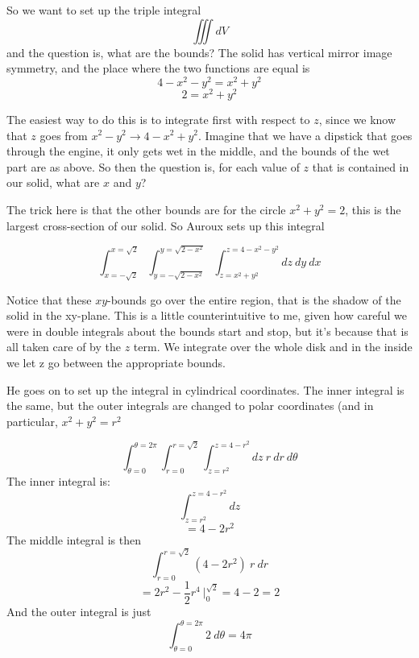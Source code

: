 \documentclass[11pt, oneside]{article}   	%
\begin{document}
So we want to set up the triple integral
\[ \iiint dV \]
and the question is, what are the bounds?  The solid has vertical mirror image symmetry, and the place where the two functions are equal is
\[  4 - x^2 - y^2 = x^2 + y^2 \]
\[  2 = x^2 + y^2 \]

The easiest way to do this is to integrate first with respect to $z$, since we know that $z$ goes from $x^2 - y^2 \to 4 - x^2 + y^2$.  Imagine that we have a dipstick that goes through the engine, it only gets wet in the middle, and the bounds of the wet part are as above.  So then the question is, for each value of $z$ that is contained in our solid, what are $x$ and $y$?

The trick here is that the other bounds are for the circle $x^2 + y^2 = 2$, this is the largest cross-section of our solid.  So Auroux sets up this integral

\[ \int_{x=-\sqrt{2}}^{x=\sqrt{2}} \int_{y=-\sqrt{2-x^2}}^{y=\sqrt{2-x^2}} \int_{z=x^2 + y^2}^{z=4- x^2 - y^2} dz \ dy \ dx \]

Notice that these $xy$-bounds go over the entire region, that is the shadow of the solid in the xy-plane.  This is a little counterintuitive to me, given how careful we were in double integrals about the bounds start and stop, but it's because that is all taken care of by the $z$ term.  We integrate over the whole disk and in the inside we let z go between the appropriate bounds.

He goes on to set up the integral in cylindrical coordinates.  The inner integral is the same, but the outer integrals are changed to polar coordinates (and in particular, $x^2 + y^2 = r^2$

\[ \int_{\theta =0}^{\theta=2\pi} \int_{r=0}^{r=\sqrt{2}} \int_{z=r^2}^{z=4- r^2} dz \ r \ dr \ d\theta \]
The inner integral is:
\[ \int_{z=r^2}^{z=4 - r^2} dz  \]
\[ = 4 - 2r^2 \]
The middle integral is then
\[ \int_{r=0}^{r=\sqrt{2}} (4 - 2r^2) \ r \ dr  \]
\[ = 2r^2 - \frac{1}{2}r^4 \ \bigg |_0^{\sqrt{2}} = 4 - 2 = 2 \]
And the outer integral is just
\[ \int_{\theta =0}^{\theta=2\pi} 2 \ d\theta = 4 \pi \]
\end{document}
